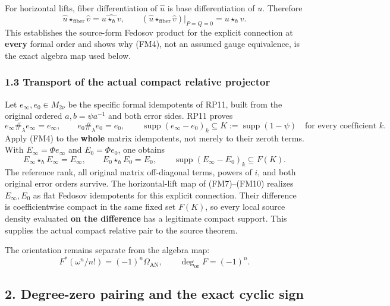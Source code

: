 \documentclass[
  11pt,
]{article}
\begin{document}
For horizontal lifts, fiber differentiation of \(\widehat u\) is base
differentiation of \(u\). Therefore \[
 \widehat u\star_{\mathrm{fiber}}\widehat v
 =\widehat{u\star_\hbar v},\qquad
 (\widehat u\star_{\mathrm{fiber}}\widehat v)|_{P=Q=0}
 =u\star_\hbar v .
 \tag{FM10}
\] This establishes the source-form Fedosov product for the explicit
connection at \textbf{every} formal order and shows why (FM4), not an
assumed gauge equivalence, is the exact algebra map used below.

\subsubsection{1.3 Transport of the actual compact relative
projector}\label{transport-of-the-actual-compact-relative-projector}

Let \(e_\infty,e_0\in M_{2\nu}\) be the specific formal idempotents of
RP11, built from the original ordered \(a,b=\psi a^{-1}\) and both error
sides. RP11 proves \[
 e_\infty\#_\lambda e_\infty=e_\infty,\qquad
 e_0\#_\lambda e_0=e_0,\qquad
 \operatorname{supp}(e_\infty-e_0)_k
  \subseteq K:=\operatorname{supp}(1-\psi)
 \quad\text{for every coefficient }k .
 \tag{FM11}
\] Apply (FM4) to the \textbf{whole} matrix idempotents, not merely to
their zeroth terms. With \(E_\infty=\Phi e_\infty\) and
\(E_0=\Phi e_0\), one obtains \[
 E_\infty\star_\hbar E_\infty=E_\infty,\qquad
 E_0\star_\hbar E_0=E_0,\qquad
 \operatorname{supp}(E_\infty-E_0)_k\subseteq F(K).
 \tag{FM12}
\] The reference rank, all original matrix off-diagonal terms, powers of
\(i\), and both original error orders survive. The horizontal-lift map
of (FM7)--(FM10) realizes \(E_\infty,E_0\) as flat Fedosov idempotents
for this explicit connection. Their difference is coefficientwise
compact in the same fixed set \(F(K)\), so every local source density
evaluated \textbf{on the difference} has a legitimate compact support.
This supplies the actual compact relative pair to the source theorem.

The orientation remains separate from the algebra map: \[
 F^*(\omega^n/n!)=(-1)^n\Omega_{\mathrm{AN}},\qquad
 \deg_{\mathrm{or}}F=(-1)^n .
 \tag{FM13}
\]

\subsection{2. Degree-zero pairing and the exact cyclic
sign}\label{degree-zero-pairing-and-the-exact-cyclic-sign}
\end{document}
